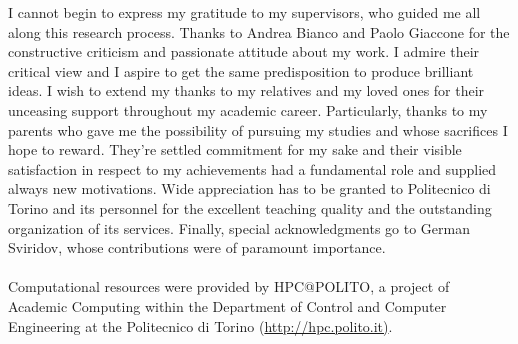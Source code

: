 \ringraziamenti
I cannot begin to express my gratitude to my supervisors, who guided me all along this research process. Thanks to Andrea Bianco and Paolo Giaccone for the constructive criticism and passionate attitude about my work. I admire their critical view and I aspire to get the same predisposition to produce brilliant ideas. I wish to extend my thanks to my relatives and my loved ones for their unceasing support throughout my academic career. Particularly, thanks to my parents who gave me the possibility of pursuing my studies and whose sacrifices I hope to reward.  They're settled commitment for my sake and their visible satisfaction in respect to my achievements had a fundamental role and supplied always new motivations.
Wide appreciation has to be granted to Politecnico di Torino and its personnel for the excellent teaching quality and the outstanding organization of its services. Finally, special acknowledgments go to German Sviridov, whose contributions were of paramount importance.
\\\\
Computational resources were provided by HPC@POLITO, a project of Academic Computing within the Department of Control and Computer 
Engineering at the Politecnico di Torino (\url{http://hpc.polito.it)}.